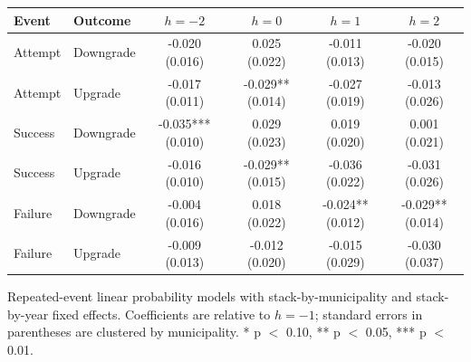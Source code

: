 \begin{center}
\tiny
\begin{tabular}{llcccc}
\toprule
Event & Outcome & $h=-2$ & $h=0$ & $h=1$ & $h=2$ \\
\midrule
Attempt & Downgrade & -0.020 (0.016) & 0.025 (0.022) & -0.011 (0.013) & -0.020 (0.015) \\
Attempt & Upgrade & -0.017 (0.011) & -0.029** (0.014) & -0.027 (0.019) & -0.013 (0.026) \\
Success & Downgrade & -0.035*** (0.010) & 0.029 (0.023) & 0.019 (0.020) & 0.001 (0.021) \\
Success & Upgrade & -0.016 (0.010) & -0.029** (0.015) & -0.036 (0.022) & -0.031 (0.026) \\
Failure & Downgrade & -0.004 (0.016) & 0.018 (0.022) & -0.024** (0.012) & -0.029** (0.014) \\
Failure & Upgrade & -0.009 (0.013) & -0.012 (0.020) & -0.015 (0.029) & -0.030 (0.037) \\
\bottomrule
\end{tabular}
\vspace{0.05cm}
\parbox{0.94\textwidth}{\tiny Repeated-event linear probability models with stack-by-municipality and stack-by-year fixed effects. Coefficients are relative to $h=-1$; standard errors in parentheses are clustered by municipality. * p $<$ 0.10, ** p $<$ 0.05, *** p $<$ 0.01.}
\end{center}
